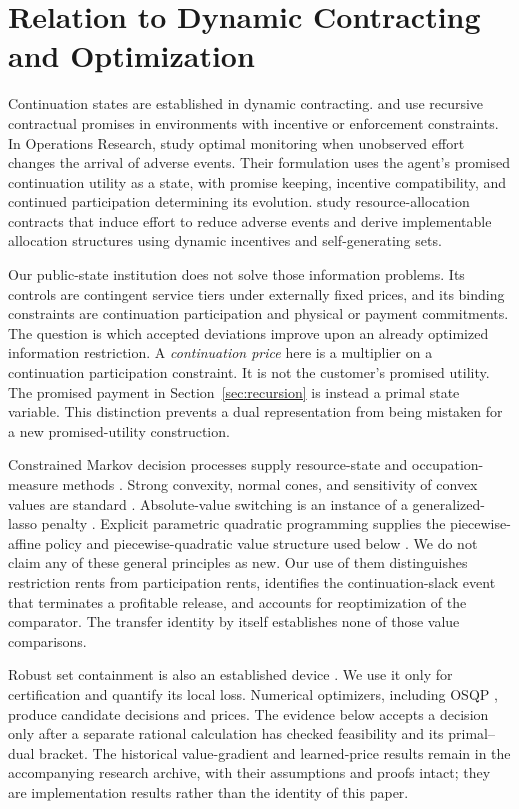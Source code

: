 \documentclass[11pt,letterpaper]{article}
\theoremstyle{definition}\newtheorem{assumption}[theorem]{Assumption}
\begin{document}
\section{Relation to Dynamic Contracting and Optimization}\label{sec:literature}
Continuation states are established in dynamic contracting. \citet{SpearSrivastava1987} and \citet{ThomasWorrall1988} use recursive contractual promises in environments with incentive or enforcement constraints. In Operations Research, \citet{ChenSunXiao2020} study optimal monitoring when unobserved effort changes the arrival of adverse events. Their formulation uses the agent's promised continuation utility as a state, with promise keeping, incentive compatibility, and continued participation determining its evolution. \citet{LiangSunTangZhang2023} study resource-allocation contracts that induce effort to reduce adverse events and derive implementable allocation structures using dynamic incentives and self-generating sets.

Our public-state institution does not solve those information problems. Its controls are contingent service tiers under externally fixed prices, and its binding constraints are continuation participation and physical or payment commitments. The question is which accepted deviations improve upon an already optimized information restriction. A \emph{continuation price} here is a multiplier on a continuation participation constraint. It is not the customer's promised utility. The promised payment in Section~\ref{sec:recursion} is instead a primal state variable. This distinction prevents a dual representation from being mistaken for a new promised-utility construction.

Constrained Markov decision processes supply resource-state and occupation-measure methods \citep{Altman1999}. Strong convexity, normal cones, and sensitivity of convex values are standard \citep{BoydVandenberghe2004}. Absolute-value switching is an instance of a generalized-lasso penalty \citep{TibshiraniTaylor2011}. Explicit parametric quadratic programming supplies the piecewise-affine policy and piecewise-quadratic value structure used below \citep{Bemporad2002}. We do not claim any of these general principles as new. Our use of them distinguishes restriction rents from participation rents, identifies the continuation-slack event that terminates a profitable release, and accounts for reoptimization of the comparator. The transfer identity by itself establishes none of those value comparisons.

Robust set containment is also an established device \citep{BenTalNemirovski2000,BertsimasSim2004}. We use it only for certification and quantify its local loss. Numerical optimizers, including OSQP \citep{Stellato2020}, produce candidate decisions and prices. The evidence below accepts a decision only after a separate rational calculation has checked feasibility and its primal--dual bracket. The historical value-gradient and learned-price results remain in the accompanying research archive, with their assumptions and proofs intact; they are implementation results rather than the identity of this paper.
\end{document}
